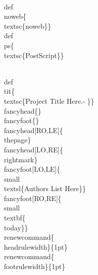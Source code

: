 \documentclass[11pt]{article}
\begin{document}
\\def\\noweb\{\\textsc\{noweb\}\}
\\def\\ps\{\\textsc\{PostScript\}\}

\\def\\tit\{\\textsc\{Project Title Here.- \}\}
\\fancyhead\{\} %
\\fancyfoot\{\} %
\\fancyhead[RO,LE]\{\\thepage\}
\\fancyhead[LO,RE]\{\\rightmark\}
\\fancyfoot[LO,LE]\{\\small\\textsl\{Authors List Here\}\}
\\fancyfoot[RO,RE]\{\\small\\textbf\{\\today\}\}
\\renewcommand\{\\headrulewidth\}\{1pt\}
\\renewcommand\{\\footrulewidth\}\{1pt\}
\end{document}
